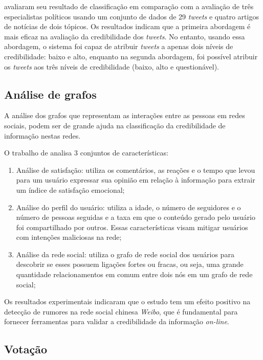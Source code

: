 \cite{alkhalifa_experimental_2011} avaliaram seu resultado de classificação em comparação com a avaliação de três especialistas políticos usando um conjunto de dados de 29 \emph{tweets} e quatro artigos de notícias de dois tópicos. Os resultados indicam que a primeira abordagem é mais eficaz na avaliação da credibilidade dos \emph{tweets}. No entanto, usando essa abordagem, o sistema foi capaz de atribuir \emph{tweets} a apenas dois níveis de credibilidade: baixo e alto, enquanto na segunda abordagem, foi possível atribuir os \emph{tweets} aos três níveis de credibilidade  (baixo, alto e questionável). 

\subsection{Análise de grafos}

A análise dos grafos que representam as interações entre as pessoas em redes sociais, podem ser de grande ajuda na classificação da credibilidade de informação nestas redes.

O trabalho de \cite{yekang_yang_exploiting_2015} analisa 3 conjuntos de características:

\begin{enumerate}
    \item Análise de satisfação: utiliza os comentários, as reações e o tempo que levou para um usuário expressar sua opinião em relação à informação para extrair um índice de satisfação emocional;
    
    \item Análise do perfil do usuário: utiliza a idade, o número de seguidores e o número de pessoas seguidas e a taxa em que o conteúdo gerado pelo usuário foi compartilhado por outros. Essas características visam mitigar usuários com intenções maliciosas na rede;

    \item Análise da rede social: utiliza o grafo de rede social dos usuários para descobrir se esses possuem ligações fortes ou fracas, ou seja, uma grande quantidade relacionamentos em comum entre dois nós em um grafo de rede social;
\end{enumerate}

Os resultados experimentais indicaram que o estudo tem um efeito positivo na detecção de rumores na rede social chinesa \emph{Weibo}, que é fundamental para fornecer ferramentas para validar a credibilidade da informação \emph{on-line}.

\subsection{Votação}

